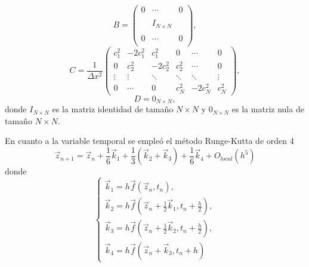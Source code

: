 \documentclass[aps,prb,twocolumn,superscriptaddress,floatfix,longbibliography,10pt]{revtex4-2}
\begin{document}
\[B = \begin{pmatrix}
  0 & \cdots & 0 \\ \\
  & I_{N \times N} & \\ \\
  0 & \cdots & 0 \\
  \end{pmatrix},
   \]
\[ C = \frac{1}{\Delta x^2} \begin{pmatrix}
  c_1^2 & -2 c_1^2 & c_1^2 & 0 & \cdots & 0 \\
  0 & c_2^2 & - 2 c_2^2 & c_2^2 & \cdots & 0 \\
  \vdots & \vdots & \ddots & \ddots & \ddots & \vdots \\
  0 & \cdots & 0 & c_N^2 & - 2 c_N^2 & c_N^2
  \end{pmatrix}, \]
\[ D =  0_{N \times N}, \]
donde $I_{N \times N}$ es la matriz identidad de tamaño $N \times N$ y $0_{N \times N}$ es la matriz nula de tamaño $N \times N$. 

En cuanto a la variable temporal se empleó el método Runge-Kutta de orden 4 \cite{Moin}
\begin{equation}
  \vec{z}_{n+1} = \vec{z}_n + \frac{1}{6} \vec{k}_1 + \frac{1}{3} (\vec{k}_2 + \vec{k}_3) + \frac{1}{6} \vec{k}_4 + O_{local}(h^5)
  \label{eq:Runge_Kutta_4}
\end{equation}
donde
\[
  \left\{\begin{matrix}
    \vec{k}_1 = h \vec{f}(\vec{z}_n, t_n), \\ 
    \vec{k}_2 = h \vec{f} \left( \vec{z}_n + \frac{1}{2} \vec{k}_1 , t_n + \frac{h}{2}\right), \\
    \vec{k}_3 = h \vec{f} \left ( \vec{z}_n + \frac{1}{2} \vec{k}_2 , t_n + \frac{h}{2}  \right ), \\
    \vec{k}_4 = h \vec{f}(\vec{z}_n + \vec{k}_3, t_n + h)
  \end{matrix}\right.
\]
\end{document}
